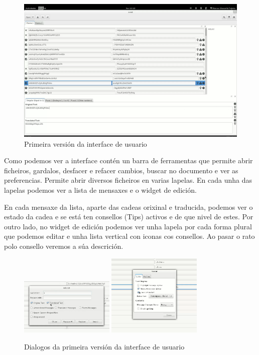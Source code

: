 \begin{figure}[h!]
  \centering
    \includegraphics[width=\textwidth]{img/gsoc1_it2_ui.png}
    \caption{Primeira versión da interface de usuario}
    \label{fig:ui:v1:general}
\end{figure}

Como podemos ver a interface contén un barra de ferramentas que permite abrir ficheiros, gardalos, desfacer e refacer cambios, buscar no documento e ver as preferencias. Permite abrir diversos ficheiros en varias lapelas. En cada unha das lapelas podemos ver a lista de mensaxes e o widget de edición.

En cada mensaxe da lista, aparte das cadeas orixinal e traducida, podemos ver o estado da cadea e se está ten consellos (Tips) activos e de que nivel de estes. Por outro lado, no widget de edición podemos ver unha lapela por cada forma plural que podemos editar e unha lista vertical con iconas cos consellos. Ao pasar o rato polo consello veremos a súa descrición.

\begin{figure}[h!]
  \centering
  \includegraphics[width=0.4\textwidth]{img/gsoc1_it3_ui.png}
  \includegraphics[width=0.4\textwidth]{img/gsoc1_it5_prefs.png}
  \caption{Dialogos da primeira versión da interface de usuario}
  \label{fig:ui:v1:dialogs}
\end{figure}

